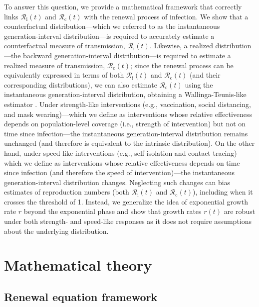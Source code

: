 \documentclass[12pt]{article}
\newcommand{\Rx}[1]{\ensuremath{{\mathcal R}_{#1}}\xspace}
\newcommand{\Rc}{\Rx{\mathrm{c}}}
\newcommand{\Ri}{\Rx{\mathrm{i}}}
\begin{document}
To answer this question, we provide a mathematical framework that correctly links $\Ri(t)$ and $\Rc(t)$ with the renewal process of infection.
We show that a counterfactual distribution---which we referred to as the instantaneous generation-interval distribution---is required to accurately estimate a counterfactual measure of transmission, $\Ri(t)$.
Likewise, a realized distribution---the backward generation-interval distribution---is required to estimate a realized measure of transmission, $\Rc(t)$;
since the renewal process can be equivalently expressed in terms of both $\Ri(t)$ and $\Rc(t)$ (and their corresponding distributions), we can also estimate $\Rc(t)$ using the instantaneous generation-interval distribution, obtaining a Wallinga-Teunis-like estimator \citep{wallinga2004different}.
Under strength-like interventions (e.g., vaccination, social distancing, and mask wearing)---which we define as interventions whose relative effectiveness depends on population-level coverage (i.e., strength of intervention) but not on time since infection---the instantaneous generation-interval distribution remains unchanged (and therefore is equivalent to the intrinsic distribution).
On the other hand, under speed-like interventions (e.g., self-isolation and contact tracing)---which we define as interventions whose relative effectiveness depends on time since infection (and therefore the speed of intervention)---the instantaneous generation-interval distribution changes.
Neglecting such changes can bias estimates of reproduction numbers (both $\Ri(t)$ and $\Rc(t)$), including when it crosses the threshold of 1.
Instead, we generalize the idea of exponential growth rate $r$ beyond the exponential phase and show that growth rates $r(t)$ are robust under both strength- and speed-like responses as it does not require assumptions about the underlying distribution.

\section{Mathematical theory}

\subsection{Renewal equation framework}
\end{document}
